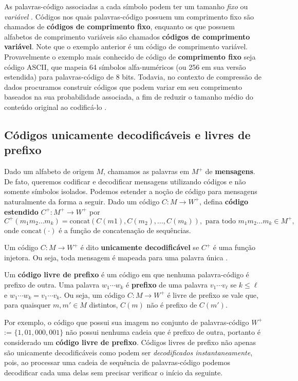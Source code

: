 As palavras-código associadas a cada símbolo podem ter um tamanho \emph{fixo} ou \emph{variável} \cite{HL}.
Códigos nos quais palavras-código possuem um comprimento fixo são chamados de \textbf{códigos de comprimento fixo}, enquanto os que possuem alfabetos de comprimento variáveis são chamados \textbf{códigos de comprimento variável}. Note que o exemplo anterior é um código de comprimento variável. 
Provavelmente o exemplo mais conhecido de código de \textbf{comprimento fixo} seja código ASCII, que mapeia 64 símbolos alfa-numéricos (ou 256 em sua versão estendida) para palavras-código de 8 bits. 
Todavia, no contexto de compressão de dados procuramos construir códigos que podem variar em seu comprimento baseados na sua probabilidade associada, a fim de reduzir o tamanho médio do conteúdo original ao codificá-lo \cite{HL}.

\subsection{Códigos unicamente decodificáveis e livres de prefixo}

Dado um alfabeto de origem $M$, chamamos as palavras em $M^+$ de
\textbf{mensagens}. De fato, queremos codificar e decodificar
mensagens utilizando códigos e não somente símbolos isolados. Podemos
estender a noção de código para mensagens naturalmente da forma a seguir. Dado um
código $C\colon M\to W^+$, defina \textbf{código estendido} $C^+: M^+\to W^+$ por
\begin{equation*}
  C^+(m_1m_2\dotsc m_k) =
  \textrm{concat}(C(m1),C(m_2),\dotsc,C(m_k)), \text{ para todo }m_1m_2\dotsc m_k\in M^+,
\end{equation*}
onde $\textrm{concat}(\cdot)$ é a função de concatenação de sequências.


Um código $C\colon M\to W^+$ é dito \textbf{unicamente decodificável}
se $C^+$ é uma função injetora. Ou seja, toda mensagem é mapeada para
uma palavra única \cite{Ble}.

Um \textbf{código livre de prefixo} é um código em que nenhuma palavra-código é prefixo de outra. 
Uma palavra $w_1\dotsm w_k$ é
\textbf{prefixo} de uma palavra $v_1\dotsm v_\ell$ se $k\leq \ell$ e
$w_1\dotsm w_k = v_1\dotsm v_k$. Ou seja, um código $C\colon M\to W^+$
é livre de prefixo se vale que, para quaisquer $m,m' \in M$ distintos,
$C(m)$ não é prefixo de $C(m')$.

Por exemplo, o código que possui sua imagem no conjunto de
palavras-código \emph{$W^+$} := $\{1, 01, 000, 001\}$ não possui
nenhuma cadeia que é prefixo de outra, portanto é considerado um
\textbf{código livre de prefixo}.  Códigos livres de prefixo não
apenas são unicamente decodificáveis como podem ser
\emph{decodificados instantaneamente}, pois, ao processar uma cadeia
de sequência de palavras-código podemos decodificar cada uma delas sem precisar verificar o início da seguinte.


